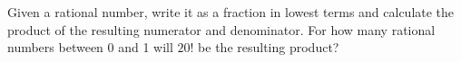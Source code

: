 Given a rational number, write it as a fraction in lowest terms and calculate the product of the resulting numerator and denominator. For how many rational numbers between 0 and 1 will $ 20!$ be the resulting product?